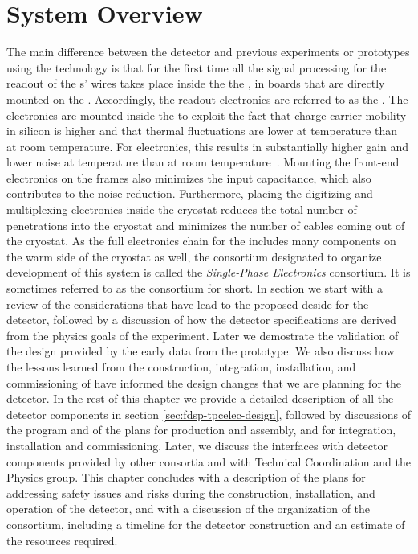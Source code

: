 \section{System Overview}
\label{sec:fdsp-tpcelec-overview}

The main difference between the   detector and 
previous experiments or prototypes using the  technology is
that for the first time all the signal processing for the readout of the
s' wires takes place inside the the , in boards that 
are directly mounted on the . Accordingly, the  
readout electronics are referred to as the . The electronics are 
mounted inside the  to exploit the fact that charge carrier 
mobility in silicon is higher and that thermal fluctuations are lower 
at  temperature than at room temperature. For  
electronics, this results in substantially higher gain and lower noise 
at  temperature than at room temperature~\cite{larCMOS}.  
Mounting the front-end electronics on the  frames also minimizes 
the input capacitance, which also contributes to the noise reduction.  
Furthermore, placing the digitizing and multiplexing electronics inside 
the cryostat reduces the total number of penetrations into the cryostat 
and minimizes the number of cables coming out of the cryostat.  
As the full  electronics chain for the  includes 
many components on the warm side of the cryostat as well, the  
consortium designated to organize development of this system is called 
the  \textit{Single-Phase  Electronics} consortium. 
It is sometimes referred to as the  consortium for short.
In section we start with a review of the considerations that
have lead to the proposed deside for the   detector,
followed by a discussion of how the detector specifications are derived
from the physics goals of the experiment. Later we demostrate the 
validation of the design provided by the early data from the 
prototype. We also discuss how the lessons learned from the construction,
integration, installation, and commissioning of  have 
informed the design changes that we are planning for the 
 detector. In the rest of this chapter we provide a detailed
description of all the  detector components in section
\ref{sec:fdsp-tpcelec-design}, followed by discussions of the 
program and of the plans for production and assembly, and for integration,
installation and commissioning. Later, we discuss the interfaces with
detector components provided by other consortia and with Technical
Coordination and the Physics group. This chapter concludes with a description
of the plans for addressing safety issues and risks during the
construction, installation, and operation of the detector, and with
a discussion of the organization of the  consortium,
including a timeline for the detector construction and an estimate
of the resources required.

